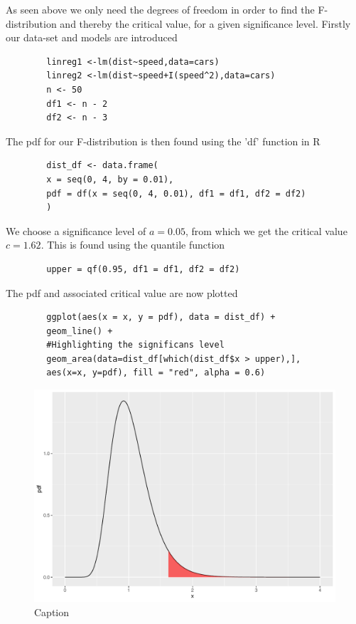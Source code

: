 \begin{example}
    As seen above we only need the degrees of freedom in order to find the F-distribution and thereby the critical value, for a given significance level.
    Firstly our data-set and models are introduced
    
    \begin{lstlisting}
        linreg1 <-lm(dist~speed,data=cars)
        linreg2 <-lm(dist~speed+I(speed^2),data=cars)
        n <- 50
        df1 <- n - 2
        df2 <- n - 3
    \end{lstlisting}
    
    The pdf for our F-distribution is then found using the 'df' function in R
    
    \begin{lstlisting}
        dist_df <- data.frame(
        x = seq(0, 4, by = 0.01),
        pdf = df(x = seq(0, 4, 0.01), df1 = df1, df2 = df2)
        )
    \end{lstlisting}
    
    We choose a significance level of $a = 0.05$, from which we get the critical value $c=1.62$. This is found using the quantile function
    
    \begin{lstlisting}
        upper = qf(0.95, df1 = df1, df2 = df2)
    \end{lstlisting}
    
    The pdf and associated critical value are now plotted
    
    \begin{lstlisting}
        ggplot(aes(x = x, y = pdf), data = dist_df) + 
        geom_line() +
        #Highlighting the significans level
        geom_area(data=dist_df[which(dist_df$x > upper),],
        aes(x=x, y=pdf), fill = "red", alpha = 0.6)
    \end{lstlisting}
    
    \begin{figure}[H]
        \centering
      \includegraphics[width = 1 \textwidth]{figures/Thea/Fdistsign.pdf}
      \caption{Caption}
      \label{fig:my_label}
    \end{figure}
    

\end{example}
